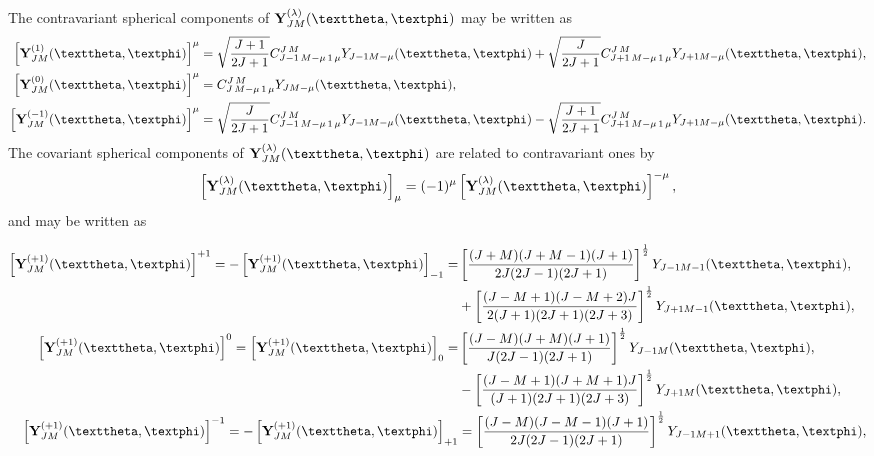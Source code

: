 \begin{enumerate}[label=(\alph*)]
\begin{equation}
\end{equation}
The contravariant spherical components of $\vect{Y}_{J M}^{(\lambda)}(\vartheta, \varphi)$ may be written as
\begin{align}
{\left[\vect{Y}_{J M}^{(1)}(\vartheta, \varphi)\right]^{\mu} } & =\sqrt{\frac{J+1}{2 J+1}} \clebsch{J-1}{M-\mu}{1}{\mu}{J}{M} Y_{J-1 M-\mu}(\vartheta, \varphi)+\sqrt{\frac{J}{2 J+1}} \clebsch{J+1}{M-\mu}{1}{\mu}{J}{M} Y_{J+1 M-\mu}(\vartheta, \varphi), \notag\\
{\left[\vect{Y}_{J M}^{(0)}(\vartheta, \varphi)\right]^{\mu} } & =\clebsch{J}{M-\mu}{1}{\mu}{J}{M} Y_{J M-\mu}(\vartheta, \varphi), \label{eq:7:3:19}\\
{\left[\vect{Y}_{J M}^{(-1)}(\vartheta, \varphi)\right]^{\mu} } & =\sqrt{\frac{J}{2 J+1}} \clebsch{J-1}{M-\mu}{1}{\mu}{J}{M} Y_{J-1 M-\mu}(\vartheta, \varphi)-\sqrt{\frac{J+1}{2 J+1}} \clebsch{J+1}{M-\mu}{1}{\mu}{J}{M} Y_{J+1 M-\mu}(\vartheta, \varphi). \notag
\end{align}
The covariant spherical components of $\vect{Y}_{J M}^{(\lambda)}(\vartheta, \varphi)$ are related to contravariant ones by
\begin{equation}
\left[\vect{Y}_{J M}^{(\lambda)}(\vartheta, \varphi)\right]_{\mu}=(-1)^{\mu}\left[\vect{Y}_{J M}^{(\lambda)}(\vartheta, \varphi)\right]^{-\mu}, \label{eq:7:3:20}
\end{equation}
and may be written as
\begin{fleqn}[1cm]
\begin{align}
{\left[\vect{Y}_{J M}^{(+1)}(\vartheta, \varphi)\right]^{+1}=-\left[\vect{Y}_{J M}^{(+1)}(\vartheta, \varphi)\right]_{-1} }  =&\left[\frac{(J+M)(J+M-1)(J+1)}{2 J(2 J-1)(2 J+1)}\right]^{\frac{1}{2}} Y_{J-1 M-1}(\vartheta, \varphi), \notag\\
& +\left[\frac{(J-M+1)(J-M+2) J}{2(J+1)(2 J+1)(2 J+3)}\right]^{\frac{1}{2}} Y_{J+1 M-1}(\vartheta, \varphi), \notag\\
{\left[\vect{Y}_{J M}^{(+1)}(\vartheta, \varphi)\right]^{0}=\left[\vect{Y}_{J M}^{(+1)}(\vartheta, \varphi)\right]_{0} }  =&\left[\frac{(J-M)(J+M)(J+1)}{J(2 J-1)(2 J+1)}\right]^{\frac{1}{2}} Y_{J-1 M}(\vartheta, \varphi), \label{eq:7:3:21}\\
& -\left[\frac{(J-M+1)(J+M+1) J}{(J+1)(2 J+1)(2 J+3)}\right]^{\frac{1}{2}} Y_{J+1 M}(\vartheta, \varphi), \notag\\
{\left[\vect{Y}_{J M}^{(+1)}(\vartheta, \varphi)\right]^{-1}=-\left[\vect{Y}_{J M}^{(+1)}(\vartheta, \varphi)\right]_{+1} }  &=\left[\frac{(J-M)(J-M-1)(J+1)}{2 J(2 J-1)(2 J+1)}\right]^{\frac{1}{2}} Y_{J-1 M+1}(\vartheta, \varphi), \notag\\

\end{align}
\end{fleqn}
\end{enumerate}
